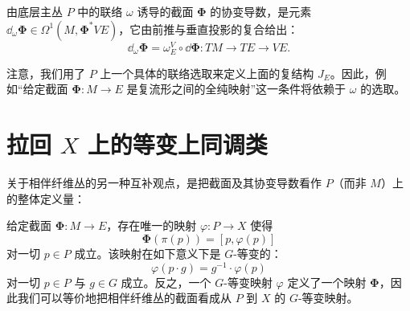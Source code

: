 
\begin{definition}
由底层主丛 $P$ 中的联络 $\omega$ 诱导的截面 $\bm{\Phi}$ 的协变导数，是元素 $\dd_\omega\bm{\Phi}\in\Omega^1(M,\bm{\Phi}^*VE)$，它由前推与垂直投影的复合给出：
\[ \dd_\omega\bm{\Phi} = \omega^V_E\circ\dd\bm{\Phi}: TM\to TE\to VE . \]
\end{definition}


注意，我们用了 $P$ 上一个具体的联络选取来定义上面的复结构 $J_E$。因此，例如“给定截面 $\bm{\Phi}: M\to E$ 是复流形之间的全纯映射”这一条件将依赖于 $\omega$ 的选取。


\section{拉回 \texorpdfstring{$X$}{X} 上的等变上同调类}

关于相伴纤维丛的另一种互补观点，是把截面及其协变导数看作 $P$（而非 $M$）上的整体定义量：

\begin{theorem}
给定截面 $\bm{\Phi}: M\to E$，存在唯一的映射 $\varphi: P\to X$ 使得
\[ \bm{\Phi}(\pi(p)) = [p,\varphi(p)] \]
对一切 $p\in P$ 成立。该映射在如下意义下是 $G$-等变的：
\[ \varphi(p\cdot g) = g^{-1}\cdot\varphi(p) \]
对一切 $p\in P$ 与 $g\in G$ 成立。反之，一个 $G$-等变映射 $\varphi$ 定义了一个映射 $\bm{\Phi}$，因此我们可以等价地把相伴纤维丛的截面看成从 $P$ 到 $X$ 的 $G$-等变映射。
\end{theorem}


